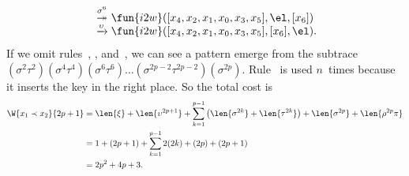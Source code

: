 \begin{itemize}
\begin{equation*}
\begin{array}{@{}r@{\;}c@{\;}l@{}}
        & \stackrel{\smash{\sigma^{\smash{6}}}}{\twoheadrightarrow}
        & \fun{i2w}([x_4,x_2,x_1,x_0,x_3,x_5],\el,[x_6])\\
        & \xrightarrow{\smash{\upsilon}}
        & \fun{i2w}([x_4,x_2,x_1,x_0,x_3,x_5],[x_6],\el).
      \end{array}
    \end{equation*}
    If we omit rules~\clause{\xi}, \clause{\upsilon}, \clause{\pi}
    and~\clause{\rho}, we can see a pattern emerge from the subtrace
    \((\sigma^2\tau^2)(\sigma^4\tau^4)(\sigma^6\tau^6) \ldots
    (\sigma^{2p-2}\tau^{2p-2})(\sigma^{2p})\). Rule~\clause{\upsilon}
    is used \(n\)~times because it inserts the key in the right
    place. So the total cost is
    \begin{align*}
      \W{x_1 \prec x_2}{2p+1}
        &= \len{\xi} + \len{\upsilon^{2p+1}}
           + \sum_{k=1}^{p-1}{\left(\len{\sigma^{2k}} + \len{\tau^{2k}}\right)}
           + \len{\sigma^{2p}} + \len{\rho^{2p}\pi}\\
        &= 1 + (2p + 1) + \sum_{k=1}^{p-1}{2(2k)} + (2p) + (2p + 1)\\
        &= 2p^2 + 4p + 3.
    \end{align*}


\end{itemize}
